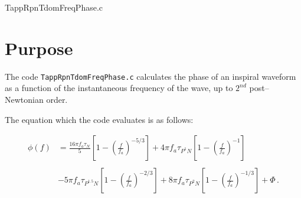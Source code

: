 \documentclass[12pt]{article}
\begin{document}
\huge
\begin{center}
TappRpnTdomFreqPhase.c
\end{center}
\normalsize
\vspace{10mm}

\section{Purpose}

The code \texttt{TappRpnTdomFreqPhase.c} calculates the phase of an inspiral waveform as a function of the instantaneous frequency of the wave, up to $2^{nd}$ post--Newtonian order.


The equation which the code evaluates is as follows:

\begin{equation}
\begin{split}
\phi(f) & = \frac{16 \pi f_{a} \tau_{N}}{5} \left[ 1 - \left( \frac{f}{f_{a}} \right)^{-5/3} \right] + 4 \pi f_{a}\tau_{P^{1}N} \left[ 1 - \left( \frac{f}{f_{a}} \right)^{-1} \right]  \\
        &     \\
        & - 5 \pi f_{a} \tau_{P^{1.5}N} \left[ 1 - \left( \frac{f}{f_{a}} \right)^{-2/3} \right] + 8 \pi f_{a} \tau_{P^{2}N} \left[ 1 - \left( \frac{f}{f_{a}} \right)^{-1/3} \right] + \Phi \,.
\end{split}
\label{phioff}
\end{equation}
\end{document}
